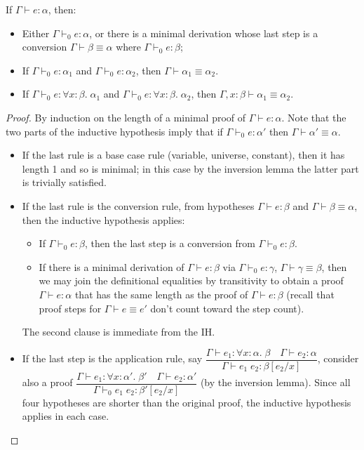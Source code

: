 \begin{lemma}
If $\Gamma\vdash e:\alpha$, then:
\begin{itemize}
\item Either $\Gamma\vdash_0 e:\alpha$, or there is a minimal derivation whose last step is a conversion $\Gamma\vdash\beta\equiv\alpha$ where $\Gamma\vdash_0e:\beta$;
\item If $\Gamma\vdash_0 e:\alpha_1$ and $\Gamma\vdash_0 e:\alpha_2$, then $\Gamma\vdash\alpha_1\equiv\alpha_2$.
\item If $\Gamma\vdash_0 e:\forall x:\beta.\;\alpha_1$ and $\Gamma\vdash_0 e:\forall x:\beta.\;\alpha_2$, then $\Gamma,x:\beta\vdash\alpha_1\equiv\alpha_2$.
\end{itemize}
\end{lemma}
\begin{proof}
By induction on the length of a minimal proof of $\Gamma\vdash e:\alpha$. Note that the two parts of the inductive hypothesis imply that if $\Gamma\vdash_0 e:\alpha'$ then $\Gamma\vdash\alpha'\equiv\alpha$.
\begin{itemize}
\item If the last rule is a base case rule (variable, universe, constant), then it has length 1 and so is minimal; in this case by the inversion lemma the latter part is trivially satisfied.
\item If the last rule is the conversion rule, from hypotheses $\Gamma\vdash e:\beta$ and $\Gamma\vdash\beta\equiv\alpha$, then the inductive hypothesis applies:
\begin{itemize}
\item If $\Gamma\vdash_0 e:\beta$, then the last step is a conversion from $\Gamma\vdash_0 e:\beta$.
\item If there is a minimal derivation of $\Gamma\vdash e:\beta$ via $\Gamma\vdash_0e:\gamma$, $\Gamma\vdash\gamma\equiv\beta$, then we may join the definitional equalities by transitivity to obtain a proof $\Gamma\vdash e:\alpha$ that has the same length as the proof of $\Gamma\vdash e:\beta$ (recall that proof steps for $\Gamma\vdash e\equiv e'$ don't count toward the step count).
\end{itemize}
The second clause is immediate from the IH.
\item If the last step is the application rule, say $\dfrac{\Gamma\vdash e_1:\forall x:\alpha.\;\beta\quad \Gamma\vdash e_2:\alpha}{\Gamma\vdash e_1\;e_2:\beta[e_2/x]}$,
consider also a proof $\dfrac{\Gamma\vdash e_1:\forall x:\alpha'.\;\beta'\quad\Gamma\vdash e_2:\alpha'}{\Gamma\vdash_0 e_1\;e_2:\beta'[e_2/x]}$ (by the inversion lemma). Since all four hypotheses are shorter than the original proof, the inductive hypothesis applies in each case.


\end{itemize}
\end{proof}
